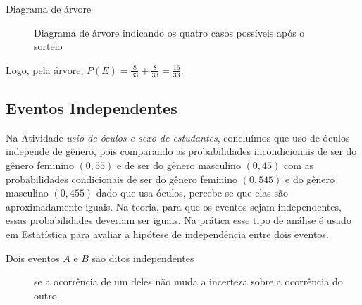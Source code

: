 \begin{example} {Diagrama de árvore}
\begin{figure}[H]
\caption{Diagrama de árvore indicando os quatro casos possíveis após o sorteio}
\label{arvore3}
\end{figure}

Logo, pela árvore, \(\displaystyle P(E)=\frac{8}{33}+\frac{8}{33}=\frac{16}{33}\).
\end{example}


\subsection{Eventos Independentes}

Na Atividade \emph{usio de óculos e sexo de estudantes}, concluímos que uso de óculos independe de gênero, pois  comparando as probabilidades incondicionais de ser do gênero feminino $(0,55)$ e de ser do gênero masculino $(0,45)$ com as probabilidades condicionais de ser do gênero feminino $(0,545)$ e do gênero masculino $(0,455)$ dado que usa óculos, percebe-se que elas são aproximadamente iguais. Na teoria, para que os eventos sejam independentes, essas probabilidades deveriam ser iguais. Na prática esse tipo de análise é usado em Estatística para avaliar a hipótese de independência entre dois eventos.
\begin{description}
\item[{Dois eventos \(A\) e \(B\) são ditos independentes}] se a ocorrência de um deles não muda a incerteza sobre a ocorrência do outro.
\end{description}

